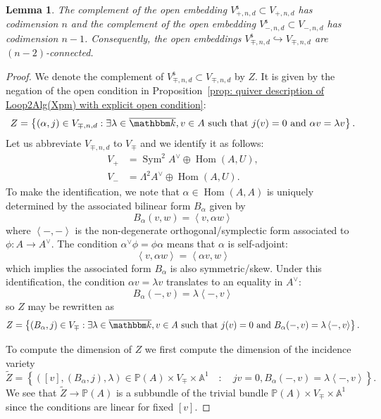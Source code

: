 \documentclass{amsart}
\newtheorem{lemma}[theorem]{Lemma}
\theoremstyle{definition}
\newcommand{\kk} {{\mathbbm k}}
\renewcommand{\AA} {{\mathbb A}}
\newcommand{\PP}{\mathbb{P}}
\newcommand{\Hom}{\operatorname{Hom}}
\newcommand{\Sym}{\operatorname{Sym}}
\newcommand{\stable}{\mathsf{s}}
\begin{document}
\begin{lemma}\label{lem: the complement of Vstable in V in the Sp/O
case has codim n} The complement of the open embedding $V^{\stable}_{+
,n,d}\subset  V_{+ ,n,d}$ has codimension $n$ and the
complement of the open embedding $V^{\stable}_{- ,n,d}\subset 
V_{- ,n,d}$ has codimension $n-1$.
Consequently, the open embeddings  $V^{\stable}_{\mp  ,n,d}\hookrightarrow
V_{\mp  ,n,d}$ are $(n-2)$-connected. 
\end{lemma}
\begin{proof}
We denote the complement of $V^{\stable}_{\mp ,n,d}\subset V_{\mp
,n,d}$ by $Z$. It is given by the negation of the open condition in
Proposition~\ref{prop: quiver description of Loop2Alg(Xpm) with
explicit open condition}:
\[
Z=\left\{(\alpha ,j)\in V_{\mp ,n,d}: \exists \lambda \in \overline{\kk} ,v\in A\text{ such that
}j(v)=0\text{ and } \alpha v=\lambda v \right\}.
\]
Let us abbreviate $V_{\mp ,n,d}$ to $V_{\mp}$ and we 
identify it as follows:
\begin{align*}
V_{+}&=\Sym^{2}A^{\vee}\oplus \Hom (A,U),\\
V_{-}&=\Lambda ^{2}A^{\vee}\oplus \Hom (A,U).
\end{align*}
To make the identification, we note that $\alpha \in \Hom (A,A)$ is
uniquely determined by the associated bilinear form $B_{\alpha}$ given
by 
\[
B_{\alpha}(v,w) = \left\langle v,\alpha w \right\rangle
\]
where $\left\langle -,- \right\rangle$ is the non-degenerate
orthogonal/symplectic form associated to $\phi :A\to A^{\vee}$. The
condition $\alpha^{\vee } \phi =\phi \alpha$ means that $\alpha$ is
self-adjoint: 
\[
\left\langle v,\alpha w \right\rangle=\left\langle \alpha v,w \right\rangle
\]
which implies the associated form $B_{\alpha}$ is also
symmetric/skew. Under this identification, the condition $\alpha
v=\lambda v$ translates to an equality in $A^{\vee}$:
\[
B_{\alpha}(-,v) = \lambda \left\langle -,v \right\rangle
\]
so $Z$ may be rewritten as
\[
Z=\left\{(B_{\alpha } ,j)\in V_{\mp}: \exists \lambda \in \overline{\kk} ,v\in A\text{ such that
}j(v)=0\text{ and }  B_{\alpha}(-,v) = \lambda \left\langle -,v \right\rangle\right\}.
\]

To compute the dimension of $Z$ we first compute the dimension of the
incidence variety
\[
\tilde{Z} =\left\{([v],(B_{\alpha},j),\lambda )\in \PP (A)\times
V_{\mp}\times \AA^{1} \quad :\quad jv=0, B_{\alpha}(-,v) = \lambda
\left\langle -,v \right\rangle   \right\}.
\]
We see that $\tilde{Z}\to \PP (A)$ is a subbundle of the trivial
bundle $\PP (A)\times V_{\mp}\times \AA^{1}$ since the conditions are
linear for fixed $[v]$.


\end{proof}
\end{document}
